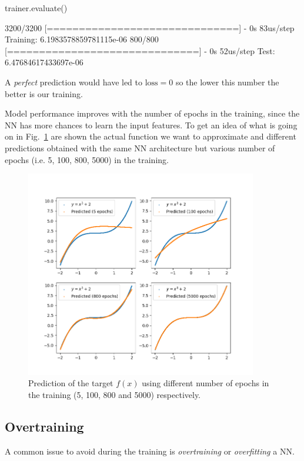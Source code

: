 \begin{ipython}
trainer.evaluate()
\end{ipython}
\begin{ioutput}
3200/3200 [==============================] - 0s 83us/step
Training: 6.1983578859781115e-06
800/800 [==============================] - 0s 52us/step
Test: 6.47684617433697e-06
\end{ioutput}
\noindent

A \emph{perfect} prediction would have led to \(\textrm{loss}=0\) so the lower this number the better is our training. 

Model performance improves with the number of epochs in the training, since the NN has more chances to learn the input features. To get an idea of what is going on in Fig.~\ref{fig:training_vs_epochs} are shown the actual function we want to approximate and different predictions obtained with the same NN architecture but various number of epochs (i.e. 5, 100, 800, 5000) in the training.

\begin{figure}[htb]
\centering
\includegraphics[width=0.9\textwidth]{figures/training_vs_epoch}
\caption{Prediction of the target $f(x)$ using different number of epochs in the training (5, 100, 800 and 5000) respectively.}
\label{fig:training_vs_epochs}
\end{figure}

\subsection{Overtraining}
A common issue to avoid during the training is \emph{overtraining} or \emph{overfitting} a NN. 

